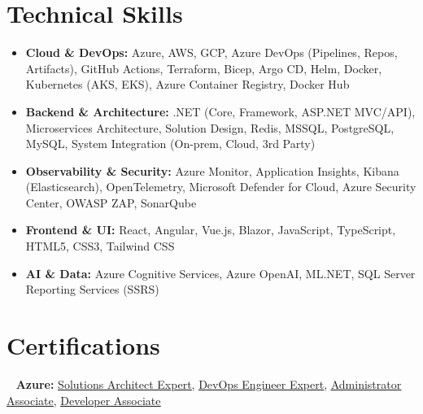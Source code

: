 \documentclass[12pt]{article}
\begin{document}
\section{Technical Skills}
\begin{itemize}[leftmargin=0.15in, label={}, itemsep=-2pt, topsep=0pt, partopsep=0pt] 
    \small
    \item \textbf{Cloud \& DevOps:} Azure, AWS, GCP, Azure DevOps (Pipelines, Repos, Artifacts), GitHub Actions, Terraform, Bicep, Argo CD, Helm, Docker, Kubernetes (AKS, EKS), Azure Container Registry, Docker Hub
    \item \textbf{Backend \& Architecture:} .NET (Core, Framework, ASP.NET MVC/API), Microservices Architecture, Solution Design, Redis, MSSQL, PostgreSQL, MySQL, System Integration (On-prem, Cloud, 3rd Party)
    \item \textbf{Observability \& Security:} Azure Monitor, Application Insights, Kibana (Elasticsearch), OpenTelemetry, Microsoft Defender for Cloud, Azure Security Center, OWASP ZAP, SonarQube
    \item \textbf{Frontend \& UI:} React, Angular, Vue.js, Blazor, JavaScript, TypeScript, HTML5, CSS3, Tailwind CSS
    \item \textbf{AI \& Data:} Azure Cognitive Services, Azure OpenAI, ML.NET,  SQL Server Reporting Services (SSRS)
\end{itemize}
\vspace{-10pt}

\section{Certifications}
\noindent %
\begin{small} %
    \faMicrosoft~ %
    \textbf{Azure:} 
    \href{https://learn.microsoft.com/api/credentials/share/en-us/wapenshaw/630EC7F36687255E?sharingId=1731259073C0B668}{\ul{Solutions Architect Expert}}, 
    \href{https://learn.microsoft.com/api/credentials/share/en-us/wapenshaw/5E49330F73A465E8?sharingId=1731259073C0B668}{\ul{DevOps Engineer Expert}}, 
    \href{https://learn.microsoft.com/api/credentials/share/en-us/wapenshaw/24EEE21A39365BBD?sharingId=1731259073C0B668}{\ul{Administrator Associate}}, 
    \href{https://learn.microsoft.com/api/credentials/share/en-us/wapenshaw/E65DD45EE23C0CF5?sharingId=1731259073C0B668}{\ul{Developer Associate}}
\end{small}
\vspace{-15pt}
\end{document}
